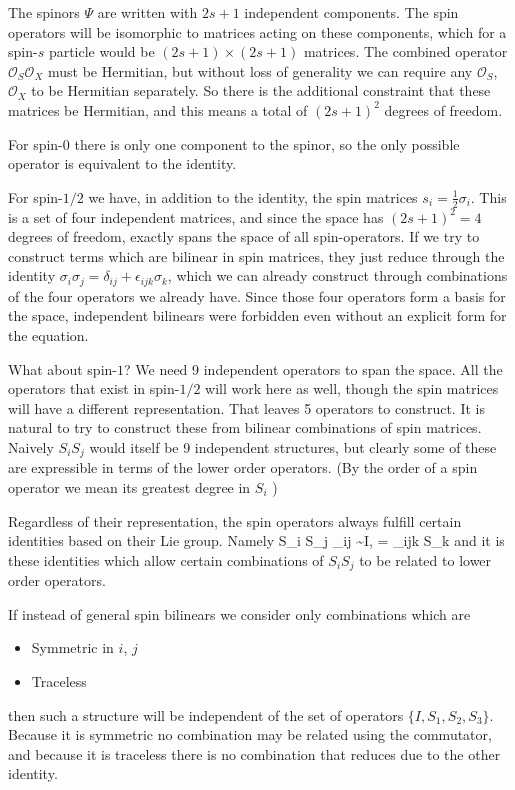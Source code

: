 The spinors $\Psi$ are written with $2s+1$ independent components.  The spin operators will be isomorphic to matrices acting on these components, which for a spin-$s$ particle would be $(2s+1) \times (2s+1)$ matrices.  The combined operator $\mathcal{O}_S \mathcal{O}_X$ must be Hermitian, but without loss of generality we can require any $\mathcal{O}_S$, $\mathcal{O}_X$ to be Hermitian separately.  So there is the additional constraint that these matrices be Hermitian, and this means a total of $(2s+1)^2$ degrees of freedom.


For spin-$0$ there is only one component to the spinor, so the only possible operator is equivalent to the identity.

For spin-$1/2$ we have, in addition to the identity, the spin matrices $s_i = \frac{1}{2} \sigma_i$.  This is a set of four independent matrices, and since the space has $(2s+1)^2 = 4$ degrees of freedom, exactly spans the space of all spin-operators.  If we try to construct terms which are bilinear in spin matrices, they just reduce through the identity $\sigma_i \sigma_j = \delta_{ij} + \epsilon_{ijk}\sigma_k$, which we can already construct through combinations of the four operators we already have.  Since those four operators form a basis for the space, independent bilinears were forbidden even without an explicit form for the equation.


What about spin-$1$?  We need 9 independent operators to span the space.  All the operators that exist in spin-$1/2$ will work here as well, though the spin matrices will have a different representation.  That leaves 5 operators to construct.  It is natural to try to construct these from bilinear combinations of spin matrices.  Naively $S_i S_j$ would itself be 9 independent structures, but clearly some of these are expressible in terms of the lower order operators.  (By the order of a spin operator we mean its greatest degree in $S_i$ )  %

Regardless of their representation, the spin operators always fulfill certain identities based on their Lie group.  Namely
\beq
	S_i S_j \delta_{ij} \sim I, \; [S_i, S_j] = \epsilon_{ijk} S_k
\eeq
and it is these identities which allow certain combinations of $S_i S_j$ to be related to lower order operators.

If instead of general spin bilinears we consider only combinations which are
\begin{itemize}
  \item Symmetric in $i$, $j$ 
  \item Traceless
\end{itemize}
then such a structure will be independent of the set of operators $\{I, S_1, S_2, S_3\}$.  Because it is symmetric no combination may be related using the commutator, and because it is traceless there is no combination that reduces due to the other identity.  %

